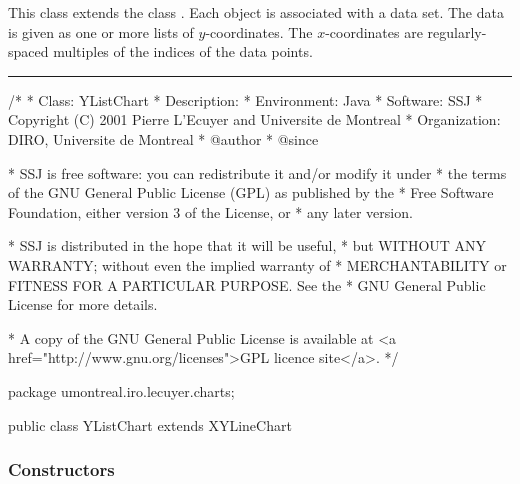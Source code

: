 

This class extends the class
.
Each  object is associated with a
 data set.
The data is given as one or more lists of $y$-coordinates.
The $x$-coordinates are
regularly-spaced multiples of the indices of the data points.


\bigskip\hrule
\begin{code}
\begin{hide}
/*
 * Class:        YListChart
 * Description:  
 * Environment:  Java
 * Software:     SSJ 
 * Copyright (C) 2001  Pierre L'Ecuyer and Universite de Montreal
 * Organization: DIRO, Universite de Montreal
 * @author       
 * @since

 * SSJ is free software: you can redistribute it and/or modify it under
 * the terms of the GNU General Public License (GPL) as published by the
 * Free Software Foundation, either version 3 of the License, or
 * any later version.

 * SSJ is distributed in the hope that it will be useful,
 * but WITHOUT ANY WARRANTY; without even the implied warranty of
 * MERCHANTABILITY or FITNESS FOR A PARTICULAR PURPOSE.  See the
 * GNU General Public License for more details.

 * A copy of the GNU General Public License is available at
   <a href="http://www.gnu.org/licenses">GPL licence site</a>.
 */
\end{hide}
package umontreal.iro.lecuyer.charts;

public class YListChart extends XYLineChart \begin{hide} {

\end{hide}
\end{code}

\subsubsection*{Constructors}


